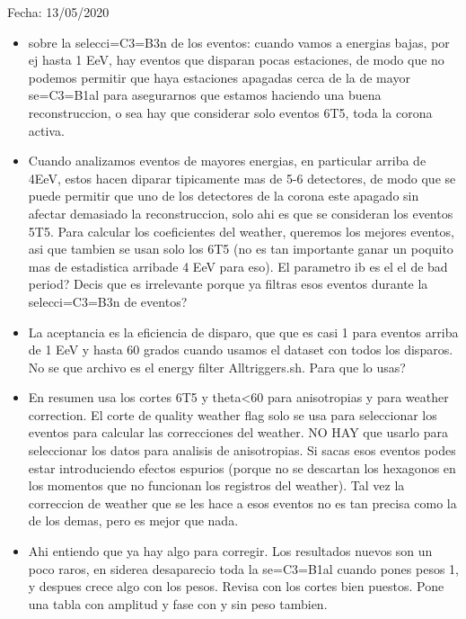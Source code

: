 Fecha: 13/05/2020

\begin{itemize}
	\item sobre la selecci=C3=B3n de los eventos: cuando vamos a energias bajas, por ej hasta 1 EeV, hay eventos que disparan pocas estaciones, de modo que no podemos permitir
que haya estaciones apagadas cerca de la de mayor se=C3=B1al para asegurarnos que estamos haciendo una buena reconstruccion, o sea hay que considerar solo eventos 6T5, toda la corona activa. 
\item Cuando analizamos eventos de mayores energias, en particular arriba de 4EeV, estos hacen diparar tipicamente mas de 5-6 detectores, de modo que se puede permitir que uno de
los detectores de la corona este apagado sin afectar demasiado la reconstruccion, solo ahi es que se consideran los eventos 5T5.
Para calcular los coeficientes del weather, queremos los mejores eventos, asi que tambien se usan solo los 6T5 (no es tan importante ganar un poquito mas de estadistica
arribade 4 EeV para eso). El parametro ib es el el de bad period? Decis que es irrelevante porque ya filtras esos eventos durante la selecci=C3=B3n de eventos?

\item La aceptancia es la eficiencia de disparo, que que es casi 1 para eventos arriba de 1 EeV y hasta 60 grados cuando usamos el dataset con todos los disparos. No se que archivo es el energy filter Alltriggers.sh. Para que lo usas?

\item En resumen usa los cortes 6T5 y theta<60 para anisotropias y para weather correction. El corte de quality weather flag solo se usa para seleccionar los eventos
para calcular las correcciones del weather. NO HAY que usarlo para seleccionar los datos para analisis de anisotropias. Si sacas esos eventos podes estar introduciendo efectos espurios (porque no se descartan los hexagonos en los momentos que no funcionan los registros del weather). Tal vez la correccion de weather que se les hace a esos eventos no es tan precisa como la de los demas, pero es mejor que nada.

\item Ahi entiendo que ya hay algo para corregir. Los resultados nuevos son un poco raros, en siderea desaparecio toda la se=C3=B1al cuando pones pesos 1, y despues crece algo con los pesos. Revisa con los cortes bien puestos. Pone una tabla con amplitud y fase con y sin peso tambien.
\end{itemize}



